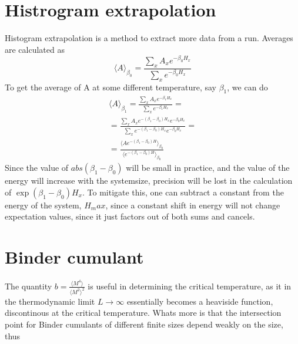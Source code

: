 \documentclass[a4paper]{article}
\begin{document}
\section{Histrogram extrapolation}
Histogram extrapolation is a method to extract more data from a run. 
Averages are calculated as
\begin{equation}
  \langle A \rangle_{\beta_0} =  \frac{\sum_{x}A_x e^{-\beta_0 H_x}}{\sum_{x}e^{-\beta_0 H_x}}
  \label{}
\end{equation}
To get the average of A at some different temperature, say $\beta_1$, we can do
\begin{align}
  \langle A\rangle_{\beta_1} =  \frac{\sum_{x}A_x e^{-\beta_1 H_x}}{\sum_{x}e^{-\beta_1 H_x}} = \\
  = \frac{\sum_x A_x e^{-(\beta_1 - \beta_0)H_x} e^{-\beta_0 H_x}}{\sum_x e^{-(\beta_1 - \beta_0)H_x}e^{-\beta_0 H_x}} = \\
  = \frac{\langle A e^{-(\beta_1 - \beta_0)H}\rangle_{\beta_0}}{\langle e^{-(\beta_1 - \beta_0)H}\rangle_{\beta_0}}
\end{align}
Since the value of $abs(\beta_1 -\beta_0)$ will be small in practice, and the value of the energy will increase with the systemsize, precision will be lost in the calculation of $\exp\left( \beta_1 - \beta_0 \right)H_x$. To mitigate this, one can subtract a constant from the energy of the system, $H_max$, since a constant shift in energy will not change expectation values, since it just factors out of both sums and cancels.
\section{Binder cumulant}
The quantity $b =\frac{\langle M^4 \rangle}{\langle M^2\rangle^2}$ is useful in determining the critical temperature, as it in the thermodynamic limit $L\rightarrow \infty $ essentially becomes a heaviside function, discontinous at the critical temperature. Whats more is that the intersection point for Binder cumulants of different finite sizes depend weakly on the size, thus 
\end{document}
